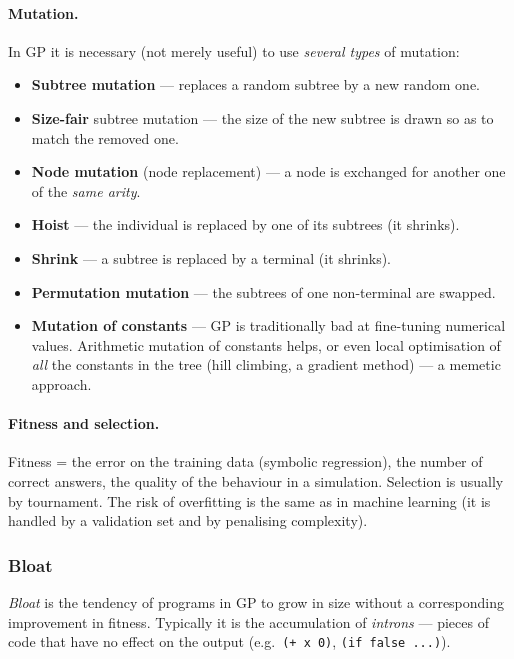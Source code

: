 \documentclass[11pt,a4paper]{article}
\theoremstyle{definition}
\begin{document}
\paragraph{Mutation.} In GP it is necessary (not merely useful) to use
\emph{several types} of mutation:
\begin{itemize}
\item \textbf{Subtree mutation} --- replaces a random subtree by a new random
  one.
\item \textbf{Size-fair} subtree mutation --- the size of the new subtree is
  drawn so as to match the removed one.
\item \textbf{Node mutation} (node replacement) --- a node is exchanged for
  another one of the \emph{same arity}.
\item \textbf{Hoist} --- the individual is replaced by one of its subtrees
  (it shrinks).
\item \textbf{Shrink} --- a subtree is replaced by a terminal (it shrinks).
\item \textbf{Permutation mutation} --- the subtrees of one non-terminal are
  swapped.
\item \textbf{Mutation of constants} --- GP is traditionally bad at fine-tuning
  numerical values. Arithmetic mutation of constants helps, or even local
  optimisation of \emph{all} the constants in the tree (hill climbing, a
  gradient method) --- a memetic approach.
\end{itemize}

\paragraph{Fitness and selection.} Fitness = the error on the training data
(symbolic regression), the number of correct answers, the quality of the
behaviour in a simulation. Selection is usually by tournament. The risk of
overfitting is the same as in machine learning (it is handled by a validation
set and by penalising complexity).

\subsubsection{Bloat}

\begin{defbox}[Bloat]
\emph{Bloat} is the tendency of programs in GP to grow in size without a
corresponding improvement in fitness. Typically it is the accumulation of
\emph{introns} --- pieces of code that have no effect on the output
(e.g.\ \texttt{(+ x 0)}, \texttt{(if false ...)}).
\end{defbox}
\end{document}
